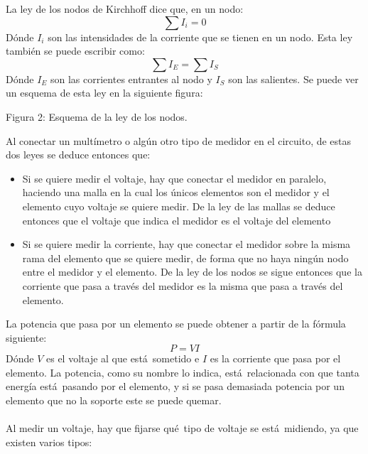 \documentclass{article}
\begin{document}
La ley de los nodos de Kirchhoff dice que, en un nodo:
\begin{equation}
\sum I_i=0
\end{equation}
D\'onde $I_i$ son las intensidades de la corriente que se tienen en un nodo. Esta ley tambi\'en se puede escribir como:
\begin{equation}
\sum I_E=\sum I_S
\end{equation}
D\'onde $I_E$ son las corrientes entrantes al nodo y $I_S$ son las salientes.
Se puede ver un esquema de esta ley en la siguiente figura:
\vspace{5cm}
\begin{center}
Figura 2: Esquema de la ley de los nodos.
\end{center}
Al conectar un mult\'imetro o alg\'un otro tipo de medidor en el circuito, de estas dos leyes se deduce entonces que:
\begin{itemize}
\item Si se quiere medir el voltaje, hay que conectar el medidor en paralelo, haciendo una malla en la cual los \'unicos elementos son el medidor y el elemento cuyo voltaje se quiere medir. De la ley de las mallas se deduce entonces que el voltaje que indica el medidor es el voltaje del elemento
\item Si se quiere medir la corriente, hay que conectar el medidor sobre la misma rama del elemento que se quiere medir, de forma que no haya ning\'un nodo entre el medidor y el elemento. De la ley de los nodos se sigue entonces que la corriente que pasa a trav\'es del medidor es la misma que pasa a trav\'es del elemento.
\end{itemize}
La potencia que pasa por un elemento se puede obtener a partir de la f\'ormula siguiente:
\begin{equation}
P=VI
\end{equation}
D\'onde $V$ es el voltaje al que est\'a\ sometido e $I$ es la corriente que pasa por el elemento. La potencia, como su nombre lo indica, est\'a\ relacionada con que tanta energ\'ia est\'a\ pasando por el elemento, y si se pasa demasiada potencia por un elemento que no la soporte este se puede quemar. \\ \\ 
Al medir un voltaje, hay que fijarse qu\'e\ tipo de voltaje se est\'a\ midiendo, ya que existen varios tipos:
\end{document}
